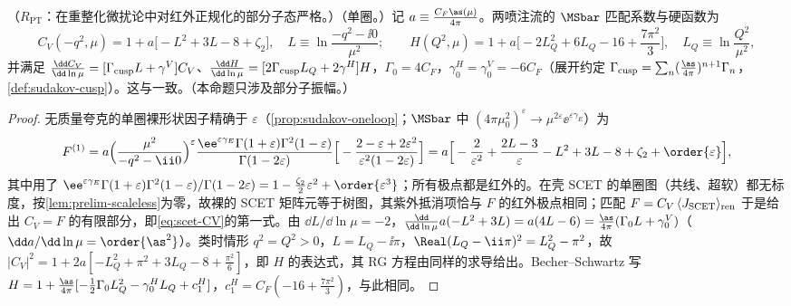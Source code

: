 \begin{proposition}\label{prop:scet-hard-matching}
（$R_{\mathrm{PT}}$：在重整化微扰论中对红外正规化的部分子态严格。）（单圈。）记 $a\equiv\frac{C_F\as(\mu)}{4\pi}$。两喷注流的 $\MSbar$ 匹配系数与硬函数为
\begin{equation}\label{eq:scet-CV}
C_V(-q^2,\mu)=1+a\big[-L^2+3L-8+\zeta_2\big],\quad L\equiv\ln\frac{-q^2-\ii0}{\mu^2};\qquad
H(Q^2,\mu)=1+a\Big[-2L_Q^2+6L_Q-16+\frac{7\pi^2}{3}\Big],\quad L_Q\equiv\ln\frac{Q^2}{\mu^2},
\end{equation}
并满足 $\frac{\dd C_V}{\dd\ln\mu}=[\Gamma_{\rm cusp}L+\gamma^V]C_V$、$\frac{\dd H}{\dd\ln\mu}=[2\Gamma_{\rm cusp}L_Q+2\gamma^H]H$，$\Gamma_0=4C_F$，$\gamma^H_0=\gamma^V_0=-6C_F$（展开约定 $\Gamma_{\rm cusp}=\sum_n(\frac{\as}{4\pi})^{n+1}\Gamma_n$，\cref{def:sudakov-cusp}）。这与\cite[附录~B]{BecherSchwartz2008}一致。（本命题只涉及部分子振幅。）
\end{proposition}

\begin{proof}
无质量夸克的单圈裸形状因子精确于 $\varepsilon$（\cref{prop:sudakov-oneloop}；$\MSbar$ 中 $(4\pi\mu_0^2)^\varepsilon\to\mu^{2\varepsilon}\ee^{\varepsilon\gamma_E}$）为
\[
F^{(1)}=a\Big(\frac{\mu^2}{-q^2-\ii0}\Big)^{\varepsilon}\frac{\ee^{\varepsilon\gamma_E}\Gamma(1+\varepsilon)\Gamma^2(1-\varepsilon)}{\Gamma(1-2\varepsilon)}\Big[-\frac{2-\varepsilon+2\varepsilon^2}{\varepsilon^2(1-2\varepsilon)}\Big]
=a\Big[-\frac{2}{\varepsilon^2}+\frac{2L-3}{\varepsilon}-L^2+3L-8+\zeta_2+\order{\varepsilon}\Big],
\]
其中用了 $\ee^{\varepsilon\gamma_E}\Gamma(1+\varepsilon)\Gamma^2(1-\varepsilon)/\Gamma(1-2\varepsilon)=1-\frac{\zeta_2}{2}\varepsilon^2+\order{\varepsilon^3}$；所有极点都是红外的。在壳 SCET 的单圈图（共线、超软）都无标度，按\cref{lem:prelim-scaleless}为零，故裸的 SCET 矩阵元等于树图，其紫外抵消项恰与 $F$ 的红外极点相同；匹配 $F=C_V\,\langle J_{\rm SCET}\rangle_{\rm ren}$ 于是给出 $C_V=F$ 的有限部分，即\cref{eq:scet-CV}的第一式。由 $\dd L/\dd\ln\mu=-2$，$\frac{\dd}{\dd\ln\mu}a(-L^2+3L)=a(4L-6)=\frac{\as}{4\pi}(\Gamma_0L+\gamma^V_0)$（$\dd a/\dd\ln\mu=\order{\as^2}$）。类时情形 $q^2=Q^2>0$，$L=L_Q-\ii\pi$，$\Real(L_Q-\ii\pi)^2=L_Q^2-\pi^2$，故 $|C_V|^2=1+2a[-L_Q^2+\pi^2+3L_Q-8+\frac{\pi^2}{6}]$，即 $H$ 的表达式，其 RG 方程由同样的求导给出。Becher--Schwartz 写 $H=1+\frac{\as}{4\pi}[-\frac12\Gamma_0L_Q^2-\gamma^H_0L_Q+c^H_1]$，$c^H_1=C_F(-16+\frac{7\pi^2}{3})$，与此相同。
\end{proof}

